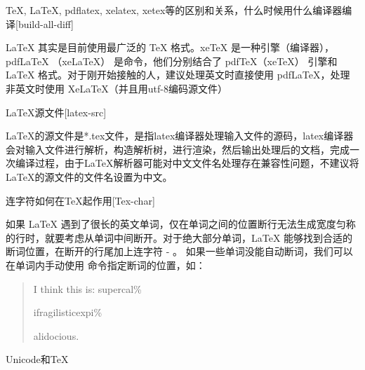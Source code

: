 \begin{faq}{\TeX{}, \LaTeX{}, pdflatex, xelatex, xetex等的区别和关系，什么时候用什么编译器编译}[build-all-diff]

  LaTeX 其实是目前使用最广泛的 \TeX{} 格式。xeTeX 是一种引擎（编译器），pdfLaTeX （xeLaTeX） 是命令，他们分别结合了 pdfTeX（xeTeX） 引擎和 \LaTeX{} 格式。对于刚开始接触的人，建议处理英文时直接使用 pdfLaTeX，处理非英文时使用 XeLaTeX（并且用utf-8编码源文件） 

\end{faq}


\begin{faq}{\LaTeX{}源文件}[latex-src]

  LaTeX的源文件是*.tex文件，是指latex编译器处理输入文件的源码，latex编译器会对输入文件进行解析，构造解析树，进行渲染，然后输出处理后的文档，完成一次编译过程，由于LaTeX解析器可能对中文文件名处理存在兼容性问题，不建议将LaTeX的源文件的文件名设置为中文。

\end{faq}

\begin{faq}{连字符如何在\TeX{}起作用}[Tex-char]

  如果 LaTeX 遇到了很长的英文单词，仅在单词之间的位置断行无法生成宽度匀称的行时，就要考虑从单词中间断开。对于绝大部分单词，LaTeX 能够找到合适的断词位置，在断开的行尾加上连字符 - 。
  如果一些单词没能自动断词，我们可以在单词内手动使用 \- 命令指定断词的位置，如：
  
  \begin{quote}
  I think this is: su\-per\-cal\-\%
  
  i\-frag\-i\-lis\-tic\-ex\-pi\-\%
  
  al\-i\-do\-cious.
  \end{quote}

\end{faq}

\begin{faq}{Unicode和\TeX{}}
\end{faq}

